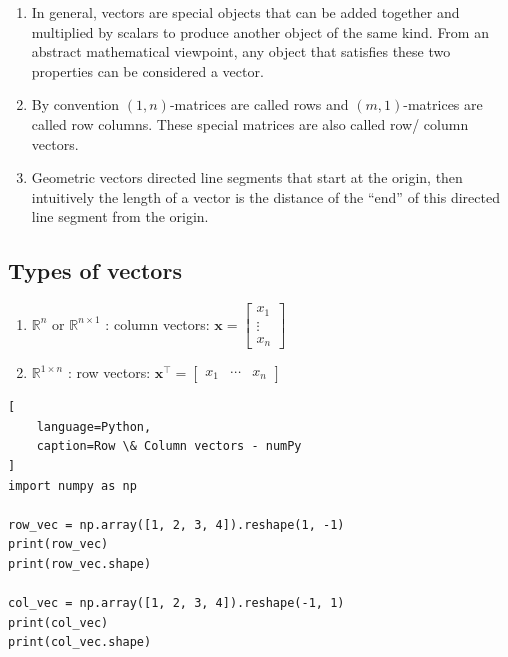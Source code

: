 \begin{enumerate}
    \item In general, vectors are special objects that can be added together and multiplied by scalars to produce another object of the same kind. From an abstract mathematical viewpoint, any object that satisfies these two properties can be considered a vector. 
    \hfill \cite{mfml/book/mml/Deisenroth-Faisal-Ong}

    \item By convention $(1, n)$-matrices are called rows and $(m, 1)$-matrices are called row columns. 
    These special matrices are also called row/ column vectors.
    \hfill \cite{mfml/book/mml/Deisenroth-Faisal-Ong}

    \item Geometric vectors directed line segments that start at the origin, then intuitively the length of a vector is the distance of the “end” of this directed line segment from the origin.
    \hfill \cite{mfml/book/mml/Deisenroth-Faisal-Ong}
\end{enumerate}




\subsection{Types of vectors}

\begin{enumerate}
    \item $\mathbb{R}^n$ or $\mathbb{R}^{n\times 1}$ : column vectors: 
    $
        \bm{x} = 
        \begin{bmatrix}
            x_1\\ \vdots \\ x_n
        \end{bmatrix}
    $
    \hfill \cite{mfml/book/mml/Deisenroth-Faisal-Ong}

    \item $\mathbb{R}^{1\times n}$ : row vectors: 
    $
        \bm{x}^\top = \begin{bmatrix}x_1 & \cdots & x_n\end{bmatrix}
    $
    \hfill \cite{mfml/book/mml/Deisenroth-Faisal-Ong}
\end{enumerate}


\begin{lstlisting}[
    language=Python,
    caption=Row \& Column vectors - numPy
]
import numpy as np

row_vec = np.array([1, 2, 3, 4]).reshape(1, -1)
print(row_vec)
print(row_vec.shape)

col_vec = np.array([1, 2, 3, 4]).reshape(-1, 1)
print(col_vec)
print(col_vec.shape)
\end{lstlisting}

